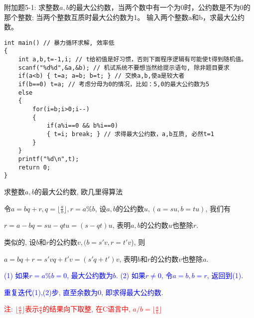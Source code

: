 \begin{frame}
附加题5-1: 求整数$a,b$的最大公约数，当两个数中有一个为0时，公约数是不为0的那个整数; 当两个整数互质时最大公约数为1。
输入两个整数a和b，求最大公约数。 
\pause
\begin{lstlisting}
int main() // 暴力循环求解, 效率低
{
	int a,b,t=-1,i; // t给初值是好习惯，否则下面程序逻辑有可能使t得到随机值。 
	scanf("%d%d",&a,&b); // 机试系统不要想当然给提示语句, 除非题目要求  
	if(a<b) { t=a; a=b; b=t; } // 交换a,b,使a是较大者 
	if(b==0) t=a; // 考虑分母为0的情况，比如：5,0的最大公约数为5 
	else
	{
		for(i=b;i>0;i--)
		{
			if(a%i==0 && b%i==0) 
			{ t=i; break; } // 求得最大公约数，a,b互质, 必然t=1 
		}
	}
	printf("%d\n",t);
	return 0;	
}
\end{lstlisting}
\end{frame}

\begin{frame}[fragile]{求整数$a,b$的最大公约数, 欧几里得算法}
\vspace{-0.3cm}

令$a=bq+r, q=\lfloor\frac{a}{b}\rfloor,r=a\%b$, 设$a,b$的公约数$u,(a=su, b=tu)$, 我们有

$r=a-bq=su-qtu=(s-qt)u$, 表明$a,b$的公约数$u$也整除$r$. 

类似的, 设$b$和$r$的公约数$v,(b=s'v, r=t'v$), 则

$a=bq+r=s'vq+t'v=(s'q+t')v$, 表明$b$和$r$的公约数$v$也整除$a$.

\medskip
\textcolor{blue}{(1) 如果$r=a\%b=0$, 最大公约数为$b$. (2) 如果$r\ne 0$, 令$a=b,b=r$, 返回到(1).}

\textcolor{blue}{重复迭代(1),(2)步, 直至余数为0, 即求得最大公约数.}

\small\textcolor{red}{注: $\lfloor\frac{a}{b}\rfloor$表示$\frac{a}{b}$的结果向下取整, 在C语言中, $a/b=\lfloor\frac{a}{b}\rfloor$}
\end{frame}

